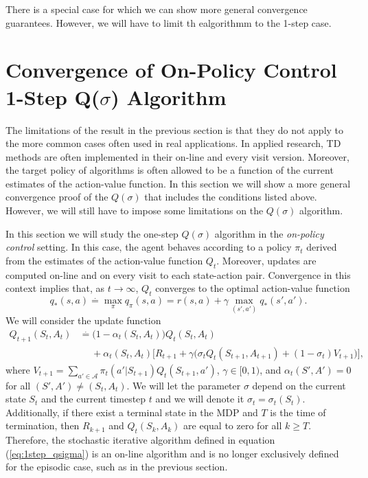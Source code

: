 There is a special case for which we can show more general convergence guarantees.
However, we will have to limit th ealgorithmm to the 1-step case.


\section{Convergence of On-Policy Control 1-Step Q($\sigma$) Algorithm}
\label{section:control_conv}

The limitations of the result in the previous section is that they do not apply to the more common cases often used in real applications.
In applied research, TD methods are often implemented in their on-line and every visit version.
Moreover, the target policy of algorithms is often allowed to be a function of the current estimates of the action-value function.
In this section we will show a more general convergence proof of the $Q(\sigma)$ that includes the conditions listed above.
However, we will still have to impose some limitations on the $Q(\sigma)$ algorithm.

In this section we will study the one-step $Q(\sigma)$ algorithm in the \textit{on-policy} \textit{control} setting. 
In this case, the agent behaves according to a policy $\pi_t$ derived from the estimates of the action-value function $Q_t$.
Moreover, updates are computed on-line and on every visit to each state-action pair.
Convergence in this context implies that, as $t\rightarrow \infty$, $Q_t$ converges to the optimal action-value function
%
\begin{equation}
q_*(s,a) \overset{.}{=} \max_\pi q_\pi(s,a) = r(s,a) + \gamma \max_{(s', a')} q_*(s',a').
\end{equation}
%
We will consider the update function
\begin{align}
\label{eq:1step_qsigma}
Q_{t+1} (S_t, A_t) &\overset{.}{=} \big( 1 - \alpha_t (S_t, A_t) \big) Q_t (S_t, A_t) 
	\nonumber \\
& \hspace{15pt} + \alpha_t (S_t, A_t) \Big[ R_{t+1} + \gamma \big( \sigma_t Q_t (S_{t+1},  A_{t+1}) 
	+ (1-\sigma_t) V_{t+1} \big) \Big],
\end{align}
%
where $V_{t+1} = \sum_{a' \in \mathcal{A}} \pi_t (a'| S_{t+1}) Q_t (S_{t+1}, a')$, $\gamma \in [0,1)$, and $\alpha_t(S',A') = 0$ for all $(S',A') \neq (S_t, A_t)$.
We will let the parameter $\sigma$ depend on the current state $S_t$ and the current timestep $t$ and we will denote it $\sigma_t = \sigma_t(S_t)$.
Additionally, if there exist a terminal state in the MDP and $T$ is the time of termination, then $R_{k+1}$ and $Q_t (S_k, A_k)$ are equal to zero for all $k \geq T$.
Therefore, the stochastic iterative algorithm defined in equation (\ref{eq:1step_qsigma}) is an on-line algorithm and is no longer exclusively defined for the episodic case, such as in the previous section.


